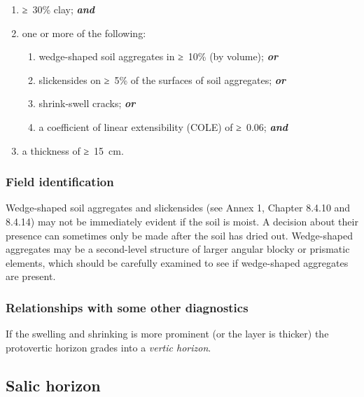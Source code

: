 \documentclass[
  letterpaper,
  DIV=11,
  numbers=noendperiod]{scrreprt}
\providecommand{\tightlist}{%
  \setlength{\itemsep}{0pt}\setlength{\parskip}{0pt}}\usepackage{longtable,booktabs,array}
\begin{document}
\begin{enumerate}
\def\labelenumi{\arabic{enumi}.}
\item
  ≥~30\% clay; \textbf{\emph{and}}
\item
  one or more of the following:

  \begin{enumerate}
  \def\labelenumii{\alph{enumii}.}
  \tightlist
  \item
    wedge-shaped soil aggregates in ≥~10\% (by volume);
    \textbf{\emph{or}}
  \item
    slickensides on ≥~5\% of the surfaces of soil aggregates;
    \textbf{\emph{or}}
  \item
    shrink-swell cracks; \textbf{\emph{or}}
  \item
    a coefficient of linear extensibility (COLE) of ≥~0.06;
    \textbf{\emph{and}}
  \end{enumerate}
\item
  a thickness of ≥~15~cm.
\end{enumerate}

\hypertarget{field-identification-23}{%
\subsubsection{Field identification}\label{field-identification-23}}

Wedge-shaped soil aggregates and slickensides (see Annex 1, Chapter
8.4.10 and 8.4.14) may not be immediately evident if the soil is moist.
A decision about their presence can sometimes only be made after the
soil has dried out. Wedge-shaped aggregates may be a second-level
structure of larger angular blocky or prismatic elements, which should
be carefully examined to see if wedge-shaped aggregates are present.

\hypertarget{relationships-with-some-other-diagnostics-31}{%
\subsubsection{Relationships with some other
diagnostics}\label{relationships-with-some-other-diagnostics-31}}

If the swelling and shrinking is more prominent (or the layer is
thicker) the protovertic horizon grades into a \emph{vertic horizon}.

\hypertarget{salic-horizon}{%
\subsection{Salic horizon}\label{salic-horizon}}
\end{document}
